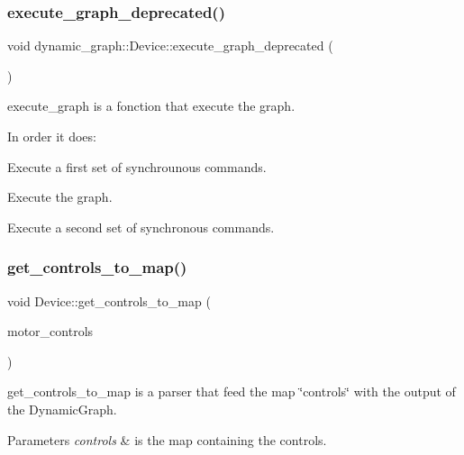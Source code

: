 \subsubsection{\texorpdfstring{execute\+\_\+graph\+\_\+deprecated()}{execute\_graph\_deprecated()}}
{\footnotesize\ttfamily void dynamic\+\_\+graph\+::\+Device\+::execute\+\_\+graph\+\_\+deprecated (\begin{DoxyParamCaption}{ }\end{DoxyParamCaption})\hspace{0.3cm}{\ttfamily [inline]}}



execute\+\_\+graph is a fonction that execute the graph. 

In order it does\+:
\begin{DoxyItemize}
\item Execute a first set of synchrounous commands.
\item Execute the graph.
\item Execute a second set of synchronous commands. 
\end{DoxyItemize}\mbox{\label{classdynamic__graph_1_1Device_a3291a91974c35f03719220e237512aa8}} 
\subsubsection{\texorpdfstring{get\+\_\+controls\+\_\+to\+\_\+map()}{get\_controls\_to\_map()}}
{\footnotesize\ttfamily void Device\+::get\+\_\+controls\+\_\+to\+\_\+map (\begin{DoxyParamCaption}\item[{\hyperlink{namespacedynamic__graph_abd184187f3bc15df5e227d866529e4a7}{Vector\+D\+G\+Map} \&}]{motor\+\_\+controls }\end{DoxyParamCaption})\hspace{0.3cm}{\ttfamily [virtual]}}



get\+\_\+controls\+\_\+to\+\_\+map is a parser that feed the map \char`\"{}controls\char`\"{} with the output of the Dynamic\+Graph. 


\begin{DoxyParams}{Parameters}
{\em controls} & is the map containing the controls. \\
\hline
\end{DoxyParams}
\mbox{\label{classdynamic__graph_1_1Device_af0e00dbc756e6191b2f5d6883187c92f}} 
